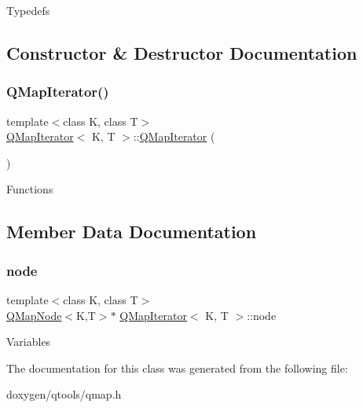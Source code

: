 Typedefs 

\subsection{Constructor \& Destructor Documentation}
\mbox{\label{class_q_map_iterator_aca07d44f63b18f752c502c77f5d6f502}} 
\subsubsection{\texorpdfstring{QMapIterator()}{QMapIterator()}}
{\footnotesize\ttfamily template$<$class K, class T$>$ \\
\mbox{\hyperlink{class_q_map_iterator}{Q\+Map\+Iterator}}$<$ K, T $>$\+::\mbox{\hyperlink{class_q_map_iterator}{Q\+Map\+Iterator}} (\begin{DoxyParamCaption}{ }\end{DoxyParamCaption})\hspace{0.3cm}{\ttfamily [inline]}}

Functions 

\subsection{Member Data Documentation}
\mbox{\label{class_q_map_iterator_a3b2c813b9d957d55ba6bf87f460e0e1e}} 
\subsubsection{\texorpdfstring{node}{node}}
{\footnotesize\ttfamily template$<$class K, class T$>$ \\
\mbox{\hyperlink{struct_q_map_node}{Q\+Map\+Node}}$<$K,T$>$$\ast$ \mbox{\hyperlink{class_q_map_iterator}{Q\+Map\+Iterator}}$<$ K, T $>$\+::node}

Variables 

The documentation for this class was generated from the following file\+:\begin{DoxyCompactItemize}
\item 
doxygen/qtools/qmap.\+h\end{DoxyCompactItemize}

